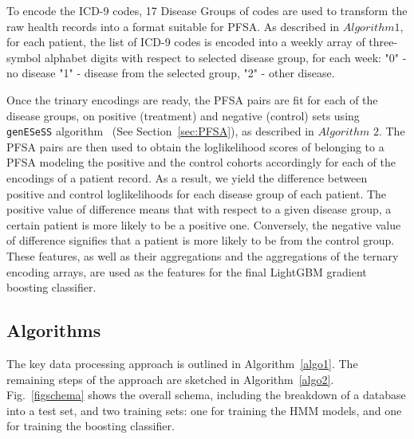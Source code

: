


To encode the ICD-9 codes, 17 Disease Groups of codes are used  to transform the raw health records into a format suitable for PFSA. As described in $Algorithm 1$, for each patient, the list of ICD-9 codes is encoded into a weekly array of three-symbol alphabet digits with respect to selected disease group, for each week: "0" - no disease "1" - disease from the selected group, "2" - other disease.

Once the trinary encodings are ready, the PFSA pairs are fit for each of the disease groups, on positive (treatment) and negative (control) sets using \texttt{genESeSS} algorithm~\cite{CL12g} (See Section~\ref{sec:PFSA}), as described in $Algorithm$ $2$. The PFSA pairs are then used to obtain the loglikelihood scores of belonging to a  PFSA modeling the positive and the control cohorts accordingly for each of the encodings of a patient record. As a result, we yield the difference between positive and control loglikelihoods for each disease group of each patient. The positive value of difference means that with respect to a given disease group, a certain patient is more likely to be a positive one. Conversely, the negative value of difference signifies that a patient is more likely to be from the control group. These features, as well as their aggregations and the aggregations of the ternary encoding arrays, are used as the features for the final  LightGBM gradient boosting classifier.

\subsection{Algorithms}
The key data processing approach is outlined in Algorithm~\ref{algo1}. The remaining steps of the approach are sketched in Algorithm~\ref{algo2}. Fig.~\ref{figschema} shows the overall schema, including the breakdown of a database into a test set, and two training sets: one for training the HMM models, and one for training the boosting classifier.

